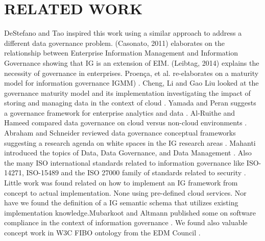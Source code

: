 \section{\uppercase{Related work}}
\label{sec:Relatedwork}
\cite{DeStefano2016} DeStefano and Tao inspired this work using a similar approach to address a different data governance problem. \cite{Casonato2011} (Casonato, 2011) elaborates on the relationship between Enterprise Information Management and Information Governance showing that IG is an extension of EIM. \cite{Leibtag2014}(Leibtag, 2014) explains the necessity of governance in enterprises. Proença, et al. re-elaborates on a maturity model for information governance IGMM) \cite{Proenca2018}. Cheng, Li and Gao Liu looked at the governance maturity model and its implementation investigating the impact of storing and managing data in the context of cloud \cite{Cheng2017}. Yamada and Peran suggests a governance framework for enterprise analytics and data \cite{Yamada2017}. Al-Ruithe and Hameed compared data governance on cloud versus non-cloud environments \cite{ALRuithe2018}. Abraham and Schneider reviewed data governance conceptual frameworks suggesting a research agenda on white spaces in the IG research areas \cite{Abraham2019}. Mahanti introduced the topics of Data, Data Governance, and Data Management \cite{Mahanti2021}. Also the many ISO international standards related to information governance like ISO-14271, ISO-15489 \cite{ISO15489} and the ISO 27000 family of standards related to security \cite{ISO27000}. Little work was found related on how to implement an IG framework from concept to actual implementation. None using pre-defined cloud services. Nor have we found the definition of a IG semantic schema that utilizes existing implementation knowledge.Mubarkoot and Altmann published some on software compliance in the context of information governance \cite{Mubarkoot2021}. We found also valuable concept work in W3C FIBO ontology from the EDM Council \cite{FIBO2020}.
\vfill